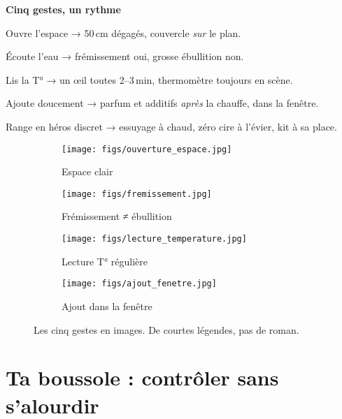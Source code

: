 \documentclass[../../main.tex]{subfiles}
\begin{document}
\begin{BlocEtapes}
\textbf{Cinq gestes, un rythme}
\begin{arrowlist}
  \item Ouvre l’espace → 50 cm dégagés, couvercle \textit{sur} le plan.
  \item Écoute l’eau → frémissement oui, grosse ébullition non.
  \item Lis la T° → un œil toutes 2–3 min, thermomètre toujours en scène.
  \item Ajoute doucement → parfum et additifs \textit{après} la chauffe, dans la fenêtre.
  \item Range en héros discret → essuyage à chaud, zéro cire à l’évier, kit à sa place.
\end{arrowlist}
\end{BlocEtapes}

\begin{figure}[!h]
  \centering
  \begin{subfigure}{0.48\linewidth}
    \texttt{[image: figs/ouverture\_espace.jpg]}
    \caption{Espace clair}
  \end{subfigure}\hfill
  \begin{subfigure}{0.48\linewidth}
    \texttt{[image: figs/fremissement.jpg]}
    \caption{Frémissement ≠ ébullition}
  \end{subfigure}

  \vspace{4pt}
  \begin{subfigure}{0.48\linewidth}
    \texttt{[image: figs/lecture\_temperature.jpg]}
    \caption{Lecture T° régulière}
  \end{subfigure}\hfill
  \begin{subfigure}{0.48\linewidth}
    \texttt{[image: figs/ajout\_fenetre.jpg]}
    \caption{Ajout dans la fenêtre}
  \end{subfigure}
  \caption{Les cinq gestes en images. De courtes légendes, pas de roman.}
\end{figure}


\section{Ta boussole : contrôler sans s’alourdir}
\end{document}
